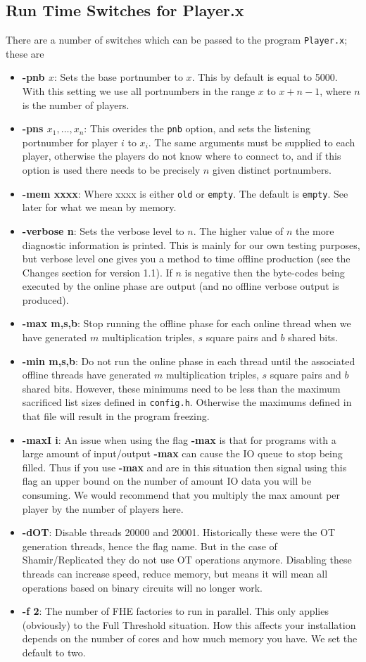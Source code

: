 \subsection{Run Time Switches for Player.x}
There are a number of switches which can be passed to the
program \verb+Player.x+; these are
\begin{itemize}
\item {\bf -pnb $x$}: Sets the base portnumber to $x$. This by
default is equal to 5000. With this setting we use all
portnumbers in the range $x$ to $x+n-1$,
where $n$ is the number of players. 
\item {\bf -pns $x_1,\ldots,x_n$}: This overides the \verb+pnb+
option, and sets the listening portnumber for player
$i$ to $x_i$.
The same arguments must be supplied to each player, otherwise
the players do not know where to connect to, and if this
option is used there needs to be precisely $n$ given
distinct portnumbers.
\item {\bf -mem xxxx}: Where xxxx is either \verb+old+
or \verb+empty+. The default is \verb+empty+.
See later for what we mean by memory.
\item {\bf -verbose n}: Sets the verbose level to $n$. The higher value
of $n$ the more diagnostic information is printed. This is mainly
for our own testing purposes, but verbose level one gives you a method
to time offline production (see the Changes section for version 1.1).
If $n$ is negative then the byte-codes being executed by the online
phase are output (and no offline verbose output is produced).
\item {\bf -max m,s,b}: Stop running the offline phase for each online
thread when we have generated $m$ multiplication triples, $s$ square
pairs and $b$ shared bits.
\item {\bf -min m,s,b}: Do not run the online phase in each thread 
until the associated offline threads have generated $m$ multiplication 
triples, $s$ square pairs and $b$ shared bits.
However, these minimums need to be less than the maximum sacrificed
list sizes defined in \verb+config.h+. Otherwise the maximums
defined in that file will result in the program freezing.
\item {\bf -maxI i}: An issue when using the flag {\bf -max} is that
for programs with a large amount of input/output {\bf -max} can cause the
IO queue to stop being filled.
Thus if you use {\bf -max} and are in this situation then signal
using this flag an upper bound on the number of amount IO data you
will be consuming. We would recommend that you multiply the max amount
per player by the number of players here.
\item {\bf -dOT}: Disable threads 20000 and 20001.
	Historically these were the OT generation threads, hence
	the flag name. But in the case of Shamir/Replicated they
	do not use OT operations anymore.
	Disabling these threads can increase speed, reduce memory, 
	but means it will mean all operations based on 
	binary circuits will no longer work.
\item {\bf -f 2}: The number of FHE factories to run in parallel.
This only applies (obviously) to the Full Threshold situation.
How this affects your installation depends on the number of cores
and how much memory you have. We set the default to two.
\end{itemize}
